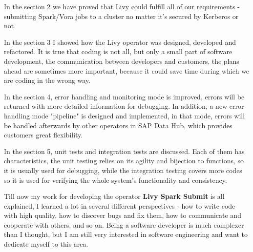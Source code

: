 \documentclass[article,colorback,accentcolor=tud4c]{tudreport}
\begin{document}
In the section 2 we have proved that Livy could fulfill all of our requirements - submitting Spark/Vora jobs to a cluster no matter it's secured by Kerberos or not. 

In the section 3 I showed how the Livy operator was designed, developed and refactored. It is true that coding is not all, but only a small part of software development, the communication between developers and customers, the plans ahead are sometimes more important, because it could save time during which we are coding in the wrong way.

In the section 4, error handling and monitoring mode is improved, errors will be returned with more detailed information for debugging. In addition, a new error handling mode "pipeline" is designed and implemented, in that mode, errors will be handled afterwards by other operators in SAP Data Hub, which provides customers great flexibility.

In the section 5, unit tests and integration tests are discussed. Each of them has characteristics, the unit testing relies on its agility and bijection to functions, so it is usually used for debugging, while the integration testing covers more codes so it is used for verifying the whole system's functionality and consistency.

Till now my work for developing the operator \textbf{Livy Spark Submit} is all explained, I learned a lot in several different perspectives - how to write code with high quality, how to discover bugs and fix them, how to communicate and cooperate with others, and so on. Being a software developer is much complexer than I thought, but I am still very interested in software engineering and want to dedicate myself to this area.

\newpage
\end{document}

